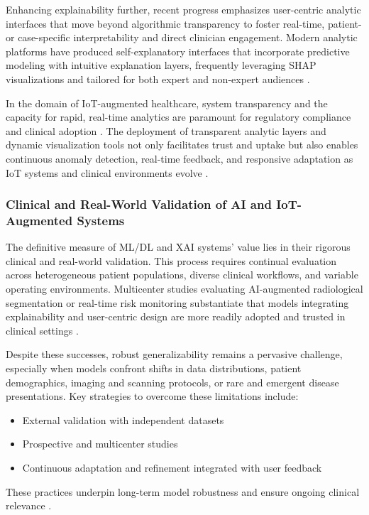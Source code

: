 Enhancing explainability further, recent progress emphasizes user-centric analytic interfaces that move beyond algorithmic transparency to foster real-time, patient- or case-specific interpretability and direct clinician engagement. Modern analytic platforms have produced self-explanatory interfaces that incorporate predictive modeling with intuitive explanation layers, frequently leveraging SHAP visualizations and tailored for both expert and non-expert audiences \cite{ref87,ref89,ref99,ref106}.

In the domain of IoT-augmented healthcare, system transparency and the capacity for rapid, real-time analytics are paramount for regulatory compliance and clinical adoption \cite{ref90,ref106}. The deployment of transparent analytic layers and dynamic visualization tools not only facilitates trust and uptake but also enables continuous anomaly detection, real-time feedback, and responsive adaptation as IoT systems and clinical environments evolve \cite{ref87,ref99}.

\subsubsection{Clinical and Real-World Validation of AI and IoT-Augmented Systems}

The definitive measure of ML/DL and XAI systems’ value lies in their rigorous clinical and real-world validation. This process requires continual evaluation across heterogeneous patient populations, diverse clinical workflows, and variable operating environments. Multicenter studies evaluating AI-augmented radiological segmentation or real-time risk monitoring substantiate that models integrating explainability and user-centric design are more readily adopted and trusted in clinical settings \cite{ref77,ref80,ref84,ref98,ref99,ref107}.

Despite these successes, robust generalizability remains a pervasive challenge, especially when models confront shifts in data distributions, patient demographics, imaging and scanning protocols, or rare and emergent disease presentations. Key strategies to overcome these limitations include:
\begin{itemize}
    \item External validation with independent datasets
    \item Prospective and multicenter studies
    \item Continuous adaptation and refinement integrated with user feedback
\end{itemize}
These practices underpin long-term model robustness and ensure ongoing clinical relevance \cite{ref77,ref99,ref107}.


